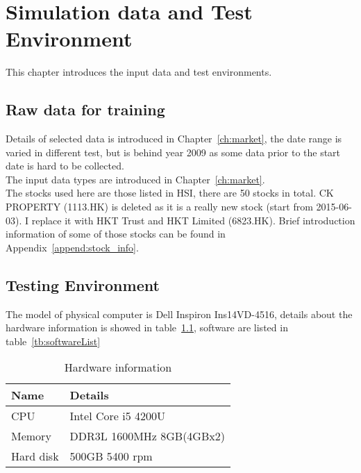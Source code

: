 \chapter{Simulation data and Test Environment}
\label{ch:dataAndEnv}

This chapter introduces the input data and test environments.

\section{Raw data for training}
Details of selected data is introduced in Chapter~\ref{ch:market}, the date range is varied in different test, but is behind year 2009 as some data prior to the start date is hard to be collected. \\

The input data types are introduced in Chapter~\ref{ch:market}.\\

The stocks used here are those listed in HSI, there are 50 stocks in total. CK PROPERTY (1113.HK) is deleted as it is a really new stock (start from 2015-06-03). I replace it with HKT Trust and HKT Limited (6823.HK). Brief introduction information of some of those stocks can be found in Appendix~\ref{append:stock_info}.\\


\section{Testing Environment}
\label{sec:environment}
The model of physical computer is Dell Inspiron Ins14VD-4516, details about the hardware information is showed in table~\ref{tb:hardwareConf}, software are listed in table~\ref{tb:softwareList}
\begin{table}[h]
	\centering
	\begin{tabular}{|l|l|}
		\hline
		\textbf{Name} & \textbf{Details} \\ \hline
		CPU & Intel Core i5 4200U \\ \hline
		Memory & DDR3L 1600MHz 8GB(4GBx2) \\ \hline
		Hard disk & 500GB 5400 rpm \\ \hline
	\end{tabular}
	\caption{Hardware information}
	\label{tb:hardwareConf}
\end{table}

